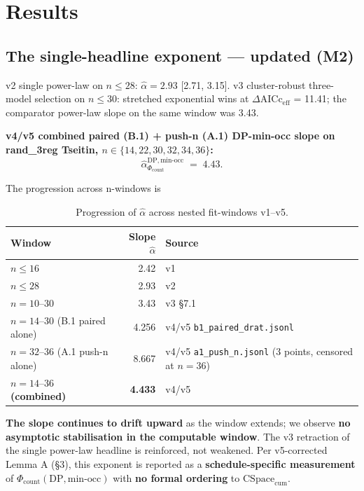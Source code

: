 \documentclass[11pt,a4paper]{article}
\theoremstyle{remark}
\begin{document}
\clearpage
\section{Results}

\subsection{The single-headline exponent --- updated (M2)}

v2 single power-law on $n \le 28$: $\widehat\alpha = 2.93$ [2.71, 3.15].
v3 cluster-robust three-model selection on $n \le 30$: stretched
exponential wins at $\Delta$AICc$_{\mathrm{eff}}$ = 11.41; the comparator
power-law slope on the same window was 3.43.

\textbf{v4/v5 combined paired (B.1) + push-n (A.1) DP-min-occ slope on
rand\_3reg Tseitin, $n \in \{14, 22, 30, 32, 34, 36\}$:}
\[
\widehat\alpha_{\Phi_{\mathrm{count}}}^{\mathrm{DP, min\text{-}occ}} \;=\;
\boxed{4.43}.
\]

The progression across n-windows is

\begin{table}[H]
\centering
\small
\begin{tabular}{@{}lr>{\raggedright\arraybackslash}p{6.0cm}@{}}
\toprule
Window & Slope $\widehat\alpha$ & Source \\
\midrule
$n \le 16$ & 2.42 & v1 \\
$n \le 28$ & 2.93 & v2 \\
$n = 10\text{--}30$ & 3.43 & v3 \S7.1 \\
$n = 14\text{--}30$ (B.1 paired alone) & 4.256 & v4/v5 \texttt{b1\_\allowbreak{}paired\_\allowbreak{}drat.jsonl} \\
$n = 32\text{--}36$ (A.1 push-n alone) & 8.667 & \makecell[tl]{v4/v5 \texttt{a1\_\allowbreak{}push\_\allowbreak{}n.jsonl}\\(3 points, censored at $n{=}36$)} \\
\textbf{$n = 14\text{--}36$ (combined)} & \textbf{4.433} & v4/v5 \\
\bottomrule
\end{tabular}
\caption{Progression of $\widehat\alpha$ across nested fit-windows v1--v5.}
\label{tab:slope-window}
\end{table}

\textbf{The slope continues to drift upward} as the window extends; we
observe \textbf{no asymptotic stabilisation in the computable window}.
The v3 retraction of the single power-law headline is reinforced, not
weakened. Per v5-corrected Lemma A (\S3), this exponent is reported as a
\textbf{schedule-specific measurement} of
$\Phi_{\mathrm{count}}(\mathrm{DP},\mathrm{min\text{-}occ})$ with
\textbf{no formal ordering} to $\mathrm{CSpace}_{\mathrm{cum}}$.
\end{document}
